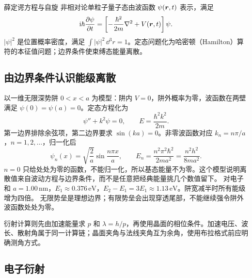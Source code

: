\begingroup{}\begin{starread}{薛定谔方程与自旋}
非相对论单粒子量子态由波函数 $\psi(\bm{r},t)$ 表示，满足
\[
 \mathrm i\hbar\frac{\partial\psi}{\partial t}
 =\left[-\frac{\hbar^2}{2m}\nabla^2+V(\bm{r},t)\right]\psi.
\]
$|\psi|^2$ 是位置概率密度，满足 $\int |\psi|^2\,\dd^3r=1$。定态问题化为哈密顿（Hamilton）算符的本征值问题；边界条件使束缚态能量离散。


\end{starread}\endgroup
\subsection{由边界条件认识能级离散}
以一维无限深势阱 $0<x<a$ 为模型：阱内 $V=0$，阱外概率为零，波函数在两壁满足 $\psi(0)=\psi(a)=0$。定态方程化为
\[
 \psi''+k^2\psi=0,\qquad E=\frac{\hbar^2k^2}{2m}.
\]
第一边界排除余弦项，第二边界要求 $\sin(ka)=0$。非零波函数对应 $k_n=n\pi/a$，$n=1,2,\ldots$，归一化后
\[
 \psi_n(x)=\sqrt{\frac2a}\sin\frac{n\pi x}{a},\qquad
 E_n=\frac{n^2\pi^2\hbar^2}{2ma^2}=\frac{n^2h^2}{8ma^2}.
\]
$n=0$ 只给处处为零的函数，不能归一化，所以基态能量不为零。这个模型说明离散值来自波动方程与边界条件，而不是任意把经典能量挑几个数值留下。
对电子和 $a=1.00\,\mathrm{nm}$，$E_1\approx0.376\,\mathrm{eV}$，$E_2-E_1=3E_1\approx1.13\,\mathrm{eV}$。阱宽减半时所有能级增为四倍。
无限势垒是理想边界；有限势垒会出现穿透尾部，不能继续强令阱外波函数处处为零。

衍射计算则先由加速能量求 $p$ 和 $\lambda=h/p$，再使用晶面的相位条件。加速电压、波长、散射角属于同一计算链；晶面夹角与法线夹角互为余角，使用布拉格式前应明确测角方式。

\subsection{电子衍射}

